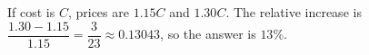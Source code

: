 If cost is $C$, prices are $1.15C$ and $1.30C$. The relative increase is $\dfrac{1.30-1.15}{1.15}=\dfrac{3}{23}\approx0.13043$, so the answer is $\boxed{13\%}$.
